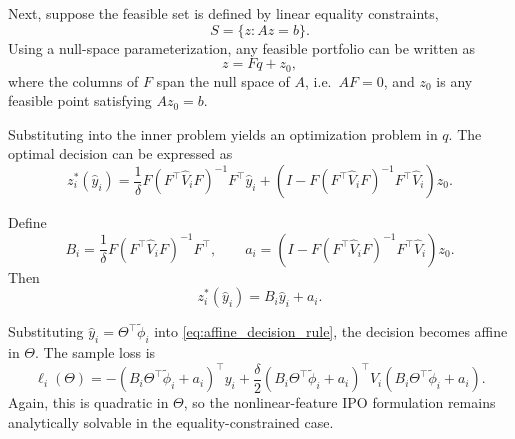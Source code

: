 \documentclass{article}
\begin{document}
Next, suppose the feasible set is defined by linear equality constraints,
\[
S = \{ z : Az = b \}.
\]
Using a null-space parameterization, any feasible portfolio can be written as
\[
z = Fq + z_0,
\]
where the columns of $F$ span the null space of $A$, i.e.\ $AF=0$, and $z_0$ is any feasible point satisfying $Az_0=b$.

Substituting into the inner problem yields an optimization problem in $q$. The optimal decision can be expressed as
\begin{equation}
z_i^*(\hat y_i)
=
\frac{1}{\delta}
F(F^\top \hat V_i F)^{-1}F^\top \hat y_i
+
\left(
I - F(F^\top \hat V_i F)^{-1}F^\top \hat V_i
\right)z_0.
\label{eq:equality_solution}
\end{equation}

Define
\[
B_i
=
\frac{1}{\delta}F(F^\top \hat V_i F)^{-1}F^\top,
\qquad
a_i
=
\left(
I - F(F^\top \hat V_i F)^{-1}F^\top \hat V_i
\right)z_0.
\]
Then
\begin{equation}
z_i^*(\hat y_i)=B_i \hat y_i + a_i.
\label{eq:affine_decision_rule}
\end{equation}

Substituting $\hat y_i=\Theta^\top \tilde\phi_i$ into \eqref{eq:affine_decision_rule}, the decision becomes affine in $\Theta$. The sample loss is
\[
\ell_i(\Theta)
=
-(B_i\Theta^\top \tilde\phi_i + a_i)^\top y_i
+\frac{\delta}{2}(B_i\Theta^\top \tilde\phi_i + a_i)^\top
V_i
(B_i\Theta^\top \tilde\phi_i + a_i).
\]
Again, this is quadratic in $\Theta$, so the nonlinear-feature IPO formulation remains analytically solvable in the equality-constrained case.
\end{document}
